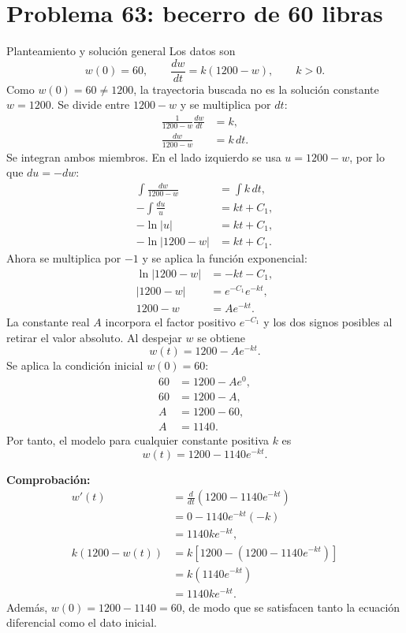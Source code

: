 \section{Problema 63: becerro de 60 libras}

\begin{examplebox}{Planteamiento y solución general}
Los datos son
\[
 w(0)=60,
 \qquad
 \frac{dw}{dt}=k(1200-w),
 \qquad k>0.
\]
Como $w(0)=60\neq1200$, la trayectoria buscada no es la solución constante $w=1200$. Se divide entre $1200-w$ y se multiplica por $dt$:
\begin{align*}
 \frac{1}{1200-w}\frac{dw}{dt}&=k,\\
 \frac{dw}{1200-w}&=k\,dt.
\end{align*}
Se integran ambos miembros. En el lado izquierdo se usa $u=1200-w$, por lo que $du=-dw$:
\begin{align*}
 \int\frac{dw}{1200-w}&=\int k\,dt,\\
 -\int\frac{du}{u}&=kt+C_1,\\
 -\ln|u|&=kt+C_1,\\
 -\ln|1200-w|&=kt+C_1.
\end{align*}
Ahora se multiplica por $-1$ y se aplica la función exponencial:
\begin{align*}
 \ln|1200-w|&=-kt-C_1,\\
 |1200-w|&=e^{-C_1}e^{-kt},\\
 1200-w&=Ae^{-kt}.
\end{align*}
La constante real $A$ incorpora el factor positivo $e^{-C_1}$ y los dos signos posibles al retirar el valor absoluto. Al despejar $w$ se obtiene
\[
 w(t)=1200-Ae^{-kt}.
\]
Se aplica la condición inicial $w(0)=60$:
\begin{align*}
 60&=1200-Ae^0,\\
 60&=1200-A,\\
 A&=1200-60,\\
 A&=1140.
\end{align*}
Por tanto, el modelo para cualquier constante positiva $k$ es
\[
 \boxed{w(t)=1200-1140e^{-kt}}.
\]

\textbf{Comprobación:}
\begin{align*}
 w'(t)&=\frac{d}{dt}\left(1200-1140e^{-kt}\right)\\
 &=0-1140e^{-kt}(-k)\\
 &=1140ke^{-kt},\\[1mm]
 k(1200-w(t))&=k\left[1200-\left(1200-1140e^{-kt}\right)\right]\\
 &=k\left(1140e^{-kt}\right)\\
 &=1140ke^{-kt}.
\end{align*}
Además, $w(0)=1200-1140=60$, de modo que se satisfacen tanto la ecuación diferencial como el dato inicial.
\end{examplebox}

